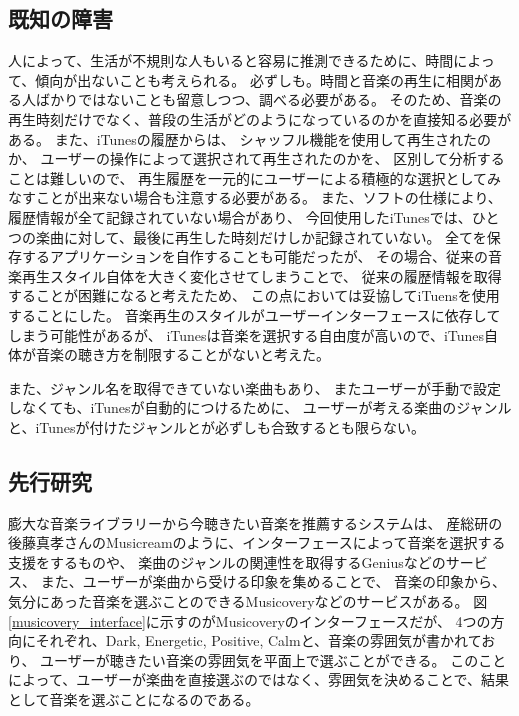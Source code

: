 \documentclass[11pt, twocolumn]{jsarticle}
\begin{document}
\subsection{既知の障害}
人によって、生活が不規則な人もいると容易に推測できるために、時間によって、傾向が出ないことも考えられる。
必ずしも。時間と音楽の再生に相関がある人ばかりではないことも留意しつつ、調べる必要がある。
そのため、音楽の再生時刻だけでなく、普段の生活がどのようになっているのかを直接知る必要がある。
また、iTunesの履歴からは、
シャッフル機能を使用して再生されたのか、
ユーザーの操作によって選択されて再生されたのかを、
区別して分析することは難しいので、
再生履歴を一元的にユーザーによる積極的な選択としてみなすことが出来ない場合も注意する必要がある。
また、ソフトの仕様により、履歴情報が全て記録されていない場合があり、
今回使用したiTunesでは、ひとつの楽曲に対して、最後に再生した時刻だけしか記録されていない。
全てを保存するアプリケーションを自作することも可能だったが、
その場合、従来の音楽再生スタイル自体を大きく変化させてしまうことで、
従来の履歴情報を取得することが困難になると考えたため、
この点においては妥協してiTuensを使用することにした。
音楽再生のスタイルがユーザーインターフェースに依存してしまう可能性があるが、
iTunesは音楽を選択する自由度が高いので、iTunes自体が音楽の聴き方を制限することがないと考えた。

また、ジャンル名を取得できていない楽曲もあり、
またユーザーが手動で設定しなくても、iTunesが自動的につけるために、
ユーザーが考える楽曲のジャンルと、iTunesが付けたジャンルとが必ずしも合致するとも限らない。
\subsection{先行研究}
膨大な音楽ライブラリーから今聴きたい音楽を推薦するシステムは、
産総研の後藤真孝さんのMusicreamのように、インターフェースによって音楽を選択する支援をするものや、
楽曲のジャンルの関連性を取得するGeniusなどのサービス、
また、ユーザーが楽曲から受ける印象を集めることで、
音楽の印象から、気分にあった音楽を選ぶことのできるMusicoveryなどのサービスがある。
図\ref{musicovery_interface}に示すのがMusicoveryのインターフェースだが、
4つの方向にそれぞれ、Dark, Energetic, Positive, Calmと、音楽の雰囲気が書かれており、
ユーザーが聴きたい音楽の雰囲気を平面上で選ぶことができる。
このことによって、ユーザーが楽曲を直接選ぶのではなく、雰囲気を決めることで、結果として音楽を選ぶことになるのである。
\end{document}
